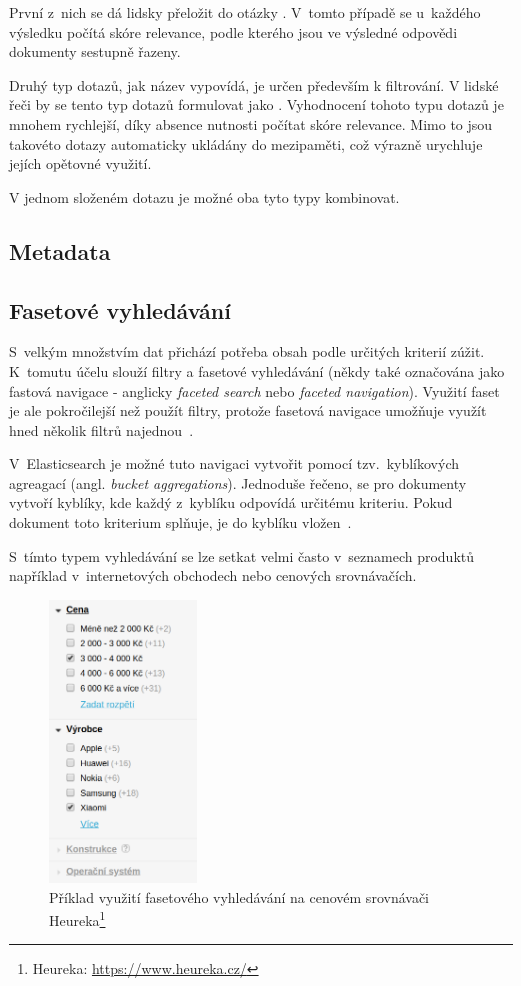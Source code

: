 První z~nich se dá lidsky přeložit do otázky . V~tomto případě se u~každého výsledku počítá skóre relevance, podle kterého jsou ve výsledné odpovědi dokumenty sestupně řazeny.

Druhý typ dotazů, jak název vypovídá, je určen především k filtrování. V lidské řeči by se tento typ dotazů formulovat jako . Vyhodnocení tohoto typu dotazů je mnohem rychlejší, díky absence nutnosti počítat skóre relevance. Mimo to jsou takovéto dotazy automaticky ukládány do mezipaměti, což výrazně urychluje jejích opětovné využití. 

V jednom složeném dotazu je možné oba tyto typy kombinovat.

\subsection{Metadata}
\blindtext

\subsection{Fasetové vyhledávání}
S~velkým množstvím dat přichází potřeba obsah podle určitých kriterií zúžit. K~tomutu účelu slouží filtry a fasetové vyhledávání (někdy také označována jako fastová navigace - anglicky \emph{faceted search} nebo \emph{faceted navigation}). Využití faset je ale pokročilejší než použít filtry, protože fasetová navigace umožňuje využít hned několik filtrů najednou~\cite{bib:facet}.

V~Elasticsearch je možné tuto navigaci vytvořit pomocí tzv.~kyblíkových agreagací (angl. \emph{bucket aggregations}).
Jednoduše řečeno, se pro dokumenty vytvoří kyblíky, kde každý z~kyblíku odpovídá určitému kriteriu. Pokud dokument toto kriterium splňuje, je do kyblíku vložen~\cite{bib:elastic-bucket}.

S~tímto typem vyhledávání se lze setkat velmi často v~seznamech produktů například v~internetových obchodech nebo cenových srovnávačích.

\begin{figure}[H]
	\centering
	\includegraphics[width=0.35\textwidth]{obrazky-figures/heureka-facet.png}
	\caption{Příklad využití fasetového vyhledávání na cenovém srovnávači Heureka\protect\footnote{Heureka: \url{https://www.heureka.cz/}}}
\end{figure}


